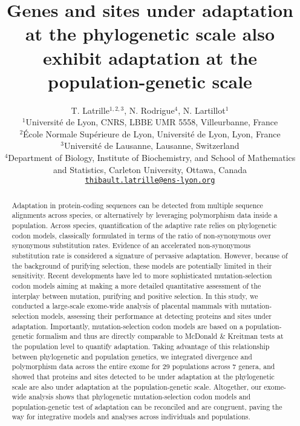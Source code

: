 \documentclass{article}
\title{Genes and sites under adaptation at the phylogenetic scale also exhibit adaptation at the population-genetic scale}
\author{
    \large
    T. {Latrille}$^{1,2,3}$, N. {Rodrigue}$^{4}$, N. {Lartillot}$^{1}$\\
    \normalsize
    $^{1}$Université de Lyon, CNRS, LBBE UMR 5558, Villeurbanne, France\\
    $^{2}$École Normale Supérieure de Lyon, Université de Lyon, Lyon, France\\
    $^{3}$Université de Lausanne, Lausanne, Switzerland\\
    $^{4}$Department of Biology, Institute of Biochemistry, and School of Mathematics and Statistics, Carleton University, Ottawa, Canada \\
    \texttt{\href{mailto:thibault.latrille@ens-lyon.org}{thibault.latrille@ens-lyon.org}} \\
}
\begin{document}
    \maketitle

    \begin{abstract}
        Adaptation in protein-coding sequences can be detected from multiple sequence alignments across species, or alternatively by leveraging polymorphism data inside a population.
        Across species, quantification of the adaptive rate relies on phylogenetic codon models, classically formulated in terms of the ratio of non-synonymous over synonymous substitution rates.
        Evidence of an accelerated non-synonymous substitution rate is considered a signature of pervasive adaptation.
        However, because of the background of purifying selection, these models are potentially limited in their sensitivity.
        Recent developments have led to more sophisticated mutation-selection codon models aiming at making a more detailed quantitative assessment of the interplay between mutation, purifying and positive selection.
        In this study, we conducted a large-scale exome-wide analysis of placental mammals with mutation-selection models, assessing their performance at detecting proteins and sites under adaptation.
        Importantly, mutation-selection codon models are based on a population-genetic formalism and thus are directly comparable to McDonald \& Kreitman tests at the population level to quantify adaptation.
        Taking advantage of this relationship between phylogenetic and population genetics, we integrated divergence and polymorphism data across the entire exome for 29 populations across 7 genera, and showed that proteins and sites detected to be under adaptation at the phylogenetic scale are also under adaptation at the population-genetic scale.
        Altogether, our exome-wide analysis shows that phylogenetic mutation-selection codon models and population-genetic test of adaptation can be reconciled and are congruent, paving the way for integrative models and analyses across individuals and populations.
    \end{abstract}

\end{document}
